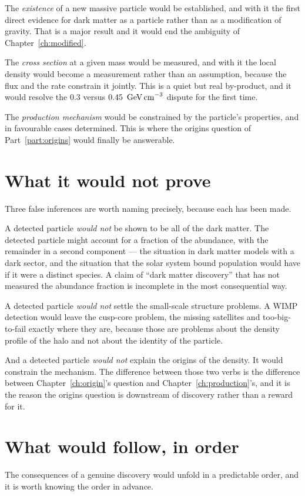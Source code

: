 The \emph{existence} of a new massive particle would be established, and
with it the first direct evidence for dark matter as a particle rather than
as a modification of gravity. That is a major result and it would end the
ambiguity of Chapter~\ref{ch:modified}.

The \emph{cross section} at a given mass would be measured, and with it the
local density would become a measurement rather than an assumption, because
the flux and the rate constrain it jointly. This is a quiet but real
by-product, and it would resolve the $0.3$ versus $0.45\ \,\mathrm{GeV\,cm}^{-3}$
dispute for the first time.

The \emph{production mechanism} would be constrained by the particle's
properties, and in favourable cases determined. This is where the
origins question of Part~\ref{part:origins} would finally be answerable.

\section{What it would not prove}Three false inferences are worth naming
precisely, because each has been made.

A detected particle \emph{would not} be shown to be all of the dark matter.
The detected particle might account for a fraction of the abundance, with
the remainder in a second component --- the situation in dark matter models
with a dark sector, and the situation that the solar system bound population
would have if it were a distinct species. A claim of ``dark matter
discovery'' that has not measured the abundance fraction is incomplete in the
most consequential way.

A detected particle \emph{would not} settle the small-scale structure
problems. A WIMP detection would leave the cusp-core problem, the missing
satellites and too-big-to-fail exactly where they are, because those are
problems about the density profile of the halo and not about the identity of
the particle.

And a detected particle \emph{would not} explain the origins of the density.
It would constrain the mechanism. The difference between those two verbs is
the difference between Chapter~\ref{ch:origin}'s question and
Chapter~\ref{ch:production}'s, and it is the reason the origins question is
downstream of discovery rather than a reward for it.

\section{What would follow, in order}The consequences of a genuine discovery
would unfold in a predictable order, and it is worth knowing the order in
advance.


